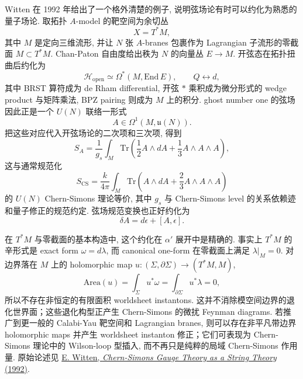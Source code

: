 \documentclass[10pt]{article}
\newcounter{ex}[section]\setcounter{ex}{0}
\numberwithin{equation}{section}
\begin{document}
Witten 在 1992 年给出了一个格外清楚的例子, 说明弦场论有时可以约化为熟悉的量子场论. 取拓扑 $A$-model 的靶空间为余切丛
\begin{equation}
X=T^*M,
\end{equation}
其中 $M$ 是定向三维流形, 并让 $N$ 张 $A$-branes 包裹作为 Lagrangian 子流形的零截面 $M\subset T^*M$. Chan-Paton 自由度给出秩为 $N$ 的向量丛 $E\to M$. 开弦态在拓扑扭曲后约化为
\begin{equation}
\mathcal H_{\mathrm{open}}\simeq
\Omega^*(M,\mathrm{End}\,E),
\qquad
Q\longleftrightarrow d,
\end{equation}
其中 BRST 算符成为 de Rham differential, 开弦 $*$ 乘积成为微分形式的 wedge product 与矩阵乘法, BPZ pairing 则成为 $M$ 上的积分. ghost number one 的弦场因此正是一个 $U(N)$ 联络一形式
\begin{equation}
A\in\Omega^1(M,\mathfrak u(N)).
\end{equation}
把这些对应代入开弦场论的二次项和三次项, 得到
\begin{equation}
S_A
=\frac{1}{g_s}\int_M
\mathrm{Tr}\left(
\frac12A\wedge dA+\frac13A\wedge A\wedge A
\right),
\label{eq:topological-a-model-cs}
\end{equation}
这与通常规范化
\begin{equation}
S_{\mathrm{CS}}
=\frac{k}{4\pi}\int_M
\mathrm{Tr}\left(
A\wedge dA+\frac23A\wedge A\wedge A
\right)
\end{equation}
的 $U(N)$ Chern-Simons 理论等价, 其中 $g_s$ 与 Chern-Simons level 的关系依赖迹和量子修正的规范约定. 弦场规范变换也正好约化为
\begin{equation}
\delta A=d\epsilon+[A,\epsilon].
\end{equation}

在 $T^*M$ 与零截面的基本构造中, 这个约化在 $\alpha'$ 展开中是精确的. 事实上 $T^*M$ 的辛形式是 exact form $\omega=d\lambda$, 而 canonical one-form 在零截面上满足 $\lambda|_M=0$. 对边界落在 $M$ 上的 holomorphic map $u:(\Sigma,\partial\Sigma)\to(T^*M,M)$,
\begin{equation}
\mathrm{Area}(u)=\int_\Sigma u^*\omega
=\int_{\partial\Sigma}u^*\lambda=0,
\end{equation}
所以不存在非恒定的有限面积 worldsheet instantons. 这并不消除模空间边界的退化世界面；这些退化构型正产生 Chern-Simons 的微扰 Feynman diagrams. 若推广到更一般的 Calabi-Yau 靶空间和 Lagrangian branes, 则可以存在非平凡带边界 holomorphic maps 并产生 worldsheet instanton 修正；它们可表现为 Chern-Simons 理论中的 Wilson-loop 型插入, 而不再只是纯粹的局域 Chern-Simons 作用量. 原始论述见 \href{https://arxiv.org/abs/hep-th/9207094}{E. Witten, \textit{Chern-Simons Gauge Theory as a String Theory} (1992)}.
\end{document}
